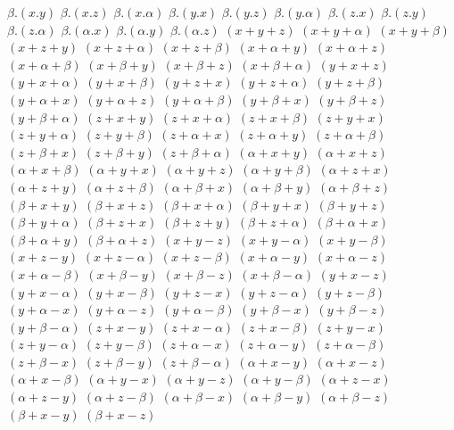 $ \beta . (x . y) $
$ \beta . (x . z) $
$ \beta . (x . \alpha) $
$ \beta . (y . x) $
$ \beta . (y . z) $
$ \beta . (y . \alpha) $
$ \beta . (z . x) $
$ \beta . (z . y) $
$ \beta . (z . \alpha) $
$ \beta . (\alpha . x) $
$ \beta . (\alpha . y) $
$ \beta . (\alpha . z) $
$ (x + y + z) $
$ (x + y + \alpha) $
$ (x + y + \beta) $
$ (x + z + y) $
$ (x + z + \alpha) $
$ (x + z + \beta) $
$ (x + \alpha + y) $
$ (x + \alpha + z) $
$ (x + \alpha + \beta) $
$ (x + \beta + y) $
$ (x + \beta + z) $
$ (x + \beta + \alpha) $
$ (y + x + z) $
$ (y + x + \alpha) $
$ (y + x + \beta) $
$ (y + z + x) $
$ (y + z + \alpha) $
$ (y + z + \beta) $
$ (y + \alpha + x) $
$ (y + \alpha + z) $
$ (y + \alpha + \beta) $
$ (y + \beta + x) $
$ (y + \beta + z) $
$ (y + \beta + \alpha) $
$ (z + x + y) $
$ (z + x + \alpha) $
$ (z + x + \beta) $
$ (z + y + x) $
$ (z + y + \alpha) $
$ (z + y + \beta) $
$ (z + \alpha + x) $
$ (z + \alpha + y) $
$ (z + \alpha + \beta) $
$ (z + \beta + x) $
$ (z + \beta + y) $
$ (z + \beta + \alpha) $
$ (\alpha + x + y) $
$ (\alpha + x + z) $
$ (\alpha + x + \beta) $
$ (\alpha + y + x) $
$ (\alpha + y + z) $
$ (\alpha + y + \beta) $
$ (\alpha + z + x) $
$ (\alpha + z + y) $
$ (\alpha + z + \beta) $
$ (\alpha + \beta + x) $
$ (\alpha + \beta + y) $
$ (\alpha + \beta + z) $
$ (\beta + x + y) $
$ (\beta + x + z) $
$ (\beta + x + \alpha) $
$ (\beta + y + x) $
$ (\beta + y + z) $
$ (\beta + y + \alpha) $
$ (\beta + z + x) $
$ (\beta + z + y) $
$ (\beta + z + \alpha) $
$ (\beta + \alpha + x) $
$ (\beta + \alpha + y) $
$ (\beta + \alpha + z) $
$ (x + y - z) $
$ (x + y - \alpha) $
$ (x + y - \beta) $
$ (x + z - y) $
$ (x + z - \alpha) $
$ (x + z - \beta) $
$ (x + \alpha - y) $
$ (x + \alpha - z) $
$ (x + \alpha - \beta) $
$ (x + \beta - y) $
$ (x + \beta - z) $
$ (x + \beta - \alpha) $
$ (y + x - z) $
$ (y + x - \alpha) $
$ (y + x - \beta) $
$ (y + z - x) $
$ (y + z - \alpha) $
$ (y + z - \beta) $
$ (y + \alpha - x) $
$ (y + \alpha - z) $
$ (y + \alpha - \beta) $
$ (y + \beta - x) $
$ (y + \beta - z) $
$ (y + \beta - \alpha) $
$ (z + x - y) $
$ (z + x - \alpha) $
$ (z + x - \beta) $
$ (z + y - x) $
$ (z + y - \alpha) $
$ (z + y - \beta) $
$ (z + \alpha - x) $
$ (z + \alpha - y) $
$ (z + \alpha - \beta) $
$ (z + \beta - x) $
$ (z + \beta - y) $
$ (z + \beta - \alpha) $
$ (\alpha + x - y) $
$ (\alpha + x - z) $
$ (\alpha + x - \beta) $
$ (\alpha + y - x) $
$ (\alpha + y - z) $
$ (\alpha + y - \beta) $
$ (\alpha + z - x) $
$ (\alpha + z - y) $
$ (\alpha + z - \beta) $
$ (\alpha + \beta - x) $
$ (\alpha + \beta - y) $
$ (\alpha + \beta - z) $
$ (\beta + x - y) $
$ (\beta + x - z) $
